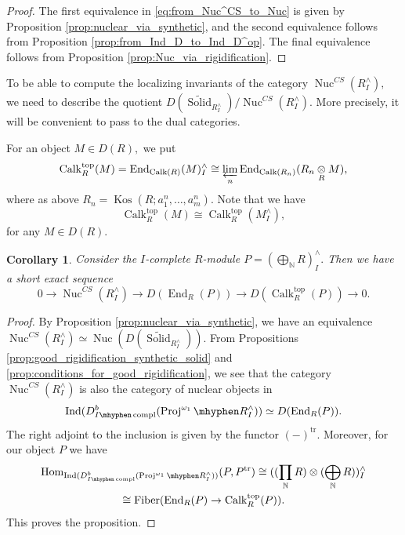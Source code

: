 \documentclass[11pt,leqno]{amsart}
\newtheorem{cor}[theo]{Corollary}
\numberwithin{equation}{section}
\def\N{\mathbb{N}}
\def\wt{\widetilde}
\def\Hom{\operatorname{Hom}}
\def\End{\operatorname{End}}
\newcommand{\tens}[1]{%
  \mathbin{\mathop{\otimes}\displaylimits_{#1}}%
}
\newcommand{\hy}{\mhyphen}
\newcommand{\prolim}[1][]{\mathop{\varprojlim}\limits_{#1}}
\newcommand{\biggplus}[1][]{\mathop{\bigoplus}\limits_{#1}}
\newcommand{\prodd}[1][]{\mathop{\prod}\limits_{#1}}
\newcommand{\Nuc}{\operatorname{Nuc}}
\newcommand{\Solid}{\operatorname{Solid}}
\newcommand{\Proj}{\operatorname{Proj}}
\newcommand{\Fiber}{\operatorname{Fiber}}
\newcommand{\topp}{\operatorname{top}}
\newcommand{\Kos}{\operatorname{Kos}}
\newcommand{\tr}{\operatorname{tr}}
\newcommand{\Ind}{\operatorname{Ind}}
\newcommand{\Calk}{\operatorname{Calk}}
\newcommand{\compl}{\operatorname{compl}}
\begin{document}
\begin{proof} The first equivalence in \eqref{eq:from_Nuc^CS_to_Nuc} is given by Proposition \ref{prop:nuclear_via_synthetic}, and the second equivalence follows from Proposition \ref{prop:from_Ind_D_to_Ind_D^op}. The final equivalence follows from Proposition \ref{prop:Nuc_via_rigidification}.
\end{proof}

To be able to compute the localizing invariants of the category $\Nuc^{CS}(R^{\wedge}_I),$ we need to describe the quotient $D(\wt{\Solid}_{R^{\wedge}_I})/\Nuc^{CS}(R^{\wedge}_I).$ More precisely, it will be convenient to pass to the dual categories. 

For an object $M\in D(R),$ we put
\begin{equation*}
\Calk_R^{\topp}(M)=\End_{\Calk(R)}(M)^{\wedge}_I\cong \prolim[n]\End_{\Calk(R_n)}(R_n\tens{R}M),
\end{equation*}
where as above $R_n=\Kos(R;a_1^n,\dots,a_m^n).$
Note that we have
\begin{equation*}
\Calk_R^{\topp}(M)\cong \Calk_R^{\topp}(M^{\wedge}_I),
\end{equation*} 
for any $M\in D(R).$

\begin{cor}\label{cor:Nuc^CS_resolution} Consider the $I$-complete $R$-module $P=(\biggplus[\N]R)^{\wedge}_I.$
Then we have a short exact sequence
\begin{equation*}
0\to \Nuc^{CS}(R^{\wedge}_I)\to D(\End_R(P))\to D(\Calk_R^{\topp}(P))\to 0.
\end{equation*}  
\end{cor}

\begin{proof}
By Proposition \ref{prop:nuclear_via_synthetic}, we have an equivalence $\Nuc^{CS}(R^{\wedge}_I)\simeq \Nuc(D(\wt{\Solid}_{R^{\wedge}_I})).$ From Propositions \ref{prop:good_rigidification_synthetic_solid} and \ref{prop:conditions_for_good_rigidification}, we see that the category $\Nuc^{CS}(R^{\wedge}_I)$ is also the category of nuclear objects in $$\Ind(D^b_{I\hy\compl}(\Proj^{\omega_1}\hy R^{\wedge}_I))\simeq D(\End_R(P)).$$ The right adjoint to the inclusion is given by the functor $(-)^{\tr}.$ Moreover, for our object $P$ we have
\begin{multline*}
\Hom_{\Ind(D^b_{I\hy\compl}(\Proj^{\omega_1}\hy R^{\wedge}_I))}(P,P^{\tr})\cong ((\prodd[\N]R)\otimes (\biggplus[\N] R))^{\wedge}_I\\
\cong\Fiber(\End_R(P)\to\Calk_R^{\topp}(P)).
\end{multline*}
This proves the proposition.
\end{proof}
\end{document}
